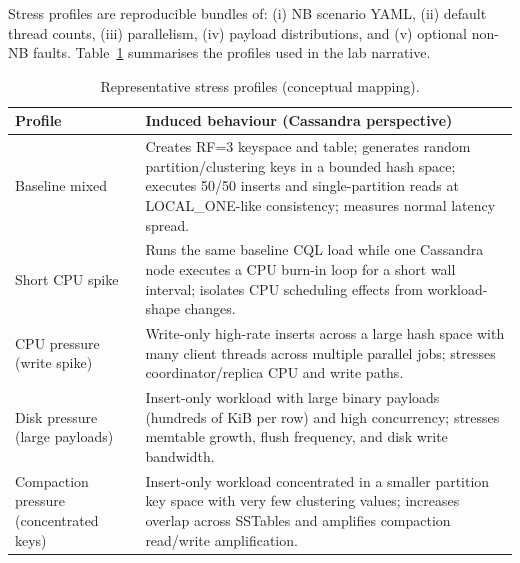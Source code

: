 \documentclass[11pt,a4paper]{article}
\begin{document}
Stress profiles are reproducible bundles of: (i) NB scenario YAML, (ii) default thread counts, (iii) parallelism, (iv) payload distributions, and (v) optional non-NB faults. Table~\ref{tab:profiles} summarises the profiles used in the lab narrative.

\FloatBarrier
\begin{table}[H]
\begin{minipage}{\linewidth}
\centering
\renewcommand{\arraystretch}{1.15}
\caption{Representative stress profiles (conceptual mapping).}
\label{tab:profiles}
\begin{tabularx}{\linewidth}{@{}>{\raggedright\arraybackslash}p{4.0cm}>{\raggedright\arraybackslash}X@{}}
\toprule
\textbf{Profile} & \textbf{Induced behaviour (Cassandra perspective)} \\
\midrule
Baseline mixed &
Creates RF=3 keyspace and table; generates random partition/clustering keys in a bounded hash space; executes 50/50 inserts and single-partition reads at LOCAL\_ONE-like consistency; measures normal latency spread. \\
Short CPU spike &
Runs the same baseline CQL load while one Cassandra node executes a CPU burn-in loop for a short wall interval; isolates CPU scheduling effects from workload-shape changes. \\
CPU pressure (write spike) &
Write-only high-rate inserts across a large hash space with many client threads across multiple parallel jobs; stresses coordinator/replica CPU and write paths. \\
Disk pressure (large payloads) &
Insert-only workload with large binary payloads (hundreds of KiB per row) and high concurrency; stresses memtable growth, flush frequency, and disk write bandwidth. \\
Compaction pressure (concentrated keys) &
Insert-only workload concentrated in a smaller partition key space with very few clustering values; increases overlap across SSTables and amplifies compaction read/write amplification. \\
\bottomrule
\end{tabularx}
\renewcommand{\arraystretch}{1}
\end{minipage}
\end{table}
\FloatBarrier
\end{document}
